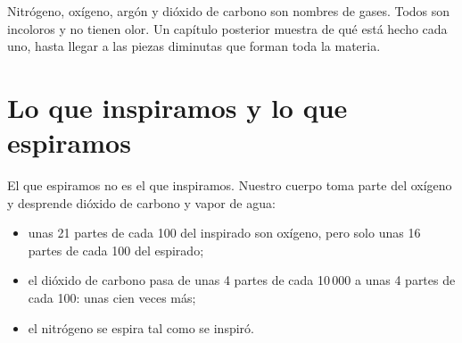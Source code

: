 \begin{remark}\label{rem:g4:air-a-mixture-of-gases:names}
Nitrógeno, oxígeno, argón y dióxido de carbono son nombres de gases.
Todos son incoloros y no tienen olor. Un capítulo posterior muestra de
qué está hecho cada uno, hasta llegar a las piezas diminutas que forman
toda la materia.
\end{remark}

\section{Lo que inspiramos y lo que espiramos}

\begin{proposition}\label{prop:g4:air-a-mixture-of-gases:breath}
El  que espiramos no es el  que inspiramos. Nuestro cuerpo toma
parte del oxígeno y desprende dióxido de carbono y vapor de agua:
\begin{itemize}
  \item unas 21 partes de cada 100 del  inspirado son oxígeno, pero
        solo unas 16 partes de cada 100 del  espirado;
  \item el dióxido de carbono pasa de unas 4 partes de cada 10\,000 a
        unas 4 partes de cada 100: unas cien veces más;
  \item el nitrógeno se espira tal como se inspiró.
\end{itemize}
\end{proposition}

